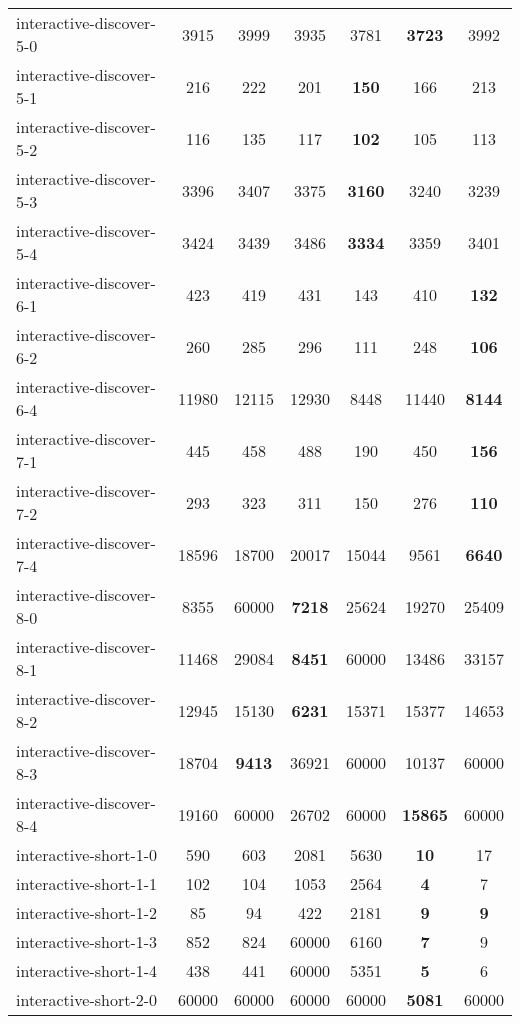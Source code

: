 \documentclass[preview]{standalone}
\begin{document}
\begin{table}[!ht]
\begin{tabular}{lcccccc}
 interactive-discover-5-0 & 3915 & 3999 & 3935 & 3781 & \textbf{3723} & 3992 \\ 
 interactive-discover-5-1 & 216 & 222 & 201 & \textbf{150} & 166 & 213 \\ 
 interactive-discover-5-2 & 116 & 135 & 117 & \textbf{102} & 105 & 113 \\ 
 interactive-discover-5-3 & 3396 & 3407 & 3375 & \textbf{3160} & 3240 & 3239 \\ 
 interactive-discover-5-4 & 3424 & 3439 & 3486 & \textbf{3334} & 3359 & 3401 \\ 
 interactive-discover-6-1 & 423 & 419 & 431 & 143 & 410 & \textbf{132} \\ 
 interactive-discover-6-2 & 260 & 285 & 296 & 111 & 248 & \textbf{106} \\ 
 interactive-discover-6-4 & 11980 & 12115 & 12930 & 8448 & 11440 & \textbf{8144} \\ 
 interactive-discover-7-1 & 445 & 458 & 488 & 190 & 450 & \textbf{156} \\ 
 interactive-discover-7-2 & 293 & 323 & 311 & 150 & 276 & \textbf{110} \\ 
 interactive-discover-7-4 & 18596 & 18700 & 20017 & 15044 & 9561 & \textbf{6640} \\ 
 interactive-discover-8-0 & 8355 & 60000 & \textbf{7218} & 25624 & 19270 & 25409 \\ 
 interactive-discover-8-1 & 11468 & 29084 & \textbf{8451} & 60000 & 13486 & 33157 \\ 
 interactive-discover-8-2 & 12945 & 15130 & \textbf{6231} & 15371 & 15377 & 14653 \\ 
 interactive-discover-8-3 & 18704 & \textbf{9413} & 36921 & 60000 & 10137 & 60000 \\ 
 interactive-discover-8-4 & 19160 & 60000 & 26702 & 60000 & \textbf{15865} & 60000 \\ 
 interactive-short-1-0 & 590 & 603 & 2081 & 5630 & \textbf{10} & 17 \\ 
 interactive-short-1-1 & 102 & 104 & 1053 & 2564 & \textbf{4} & 7 \\ 
 interactive-short-1-2 & 85 & 94 & 422 & 2181 & \textbf{9} & \textbf{9} \\ 
 interactive-short-1-3 & 852 & 824 & 60000 & 6160 & \textbf{7} & 9 \\ 
 interactive-short-1-4 & 438 & 441 & 60000 & 5351 & \textbf{5} & 6 \\ 
 interactive-short-2-0 & 60000 & 60000 & 60000 & 60000 & \textbf{5081} & 60000 \\ 

\end{tabular}
\end{table}
\end{document}
